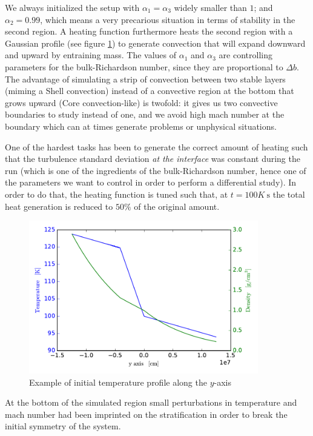 We always initialized the setup with $\alpha_{1} = \alpha_{3}$ widely smaller than $1$; and $\alpha_{2}=0.99$, which means a very precarious situation in terms of stability in the second region. A heating function furthermore heats the second region with a Gaussian profile (see figure \ref{fig:twin}) to generate convection that will expand downward and upward by entraining mass. The values of $\alpha_{1}$ and $\alpha_{3}$ are controlling parameters for the bulk-Richardson number, since they are proportional to $\Delta b$. The advantage of simulating a strip of convection between two stable layers (miming a Shell convection) instead of a convective region at the bottom that grows upward (Core convection-like) is twofold: it gives us two convective boundaries to study instead of one, and we avoid high mach number at the boundary which can at times generate problems or unphysical situations. 

One of the hardest tasks has been to generate the correct amount of heating such that the turbulence standard deviation \textit{at the interface} was constant during the run (which is one of the ingredients of the bulk-Richardson number, hence one of the parameters we want to control in order to perform a differential study). In order to do that, the heating function is tuned such that, at $t=100K \ \mathrm{s}$ the total heat generation is reduced to $50 \%$ of the original amount.

\begin{figure}[t]
\centering
\includegraphics[width=10cm]{./img/twin.pdf}
\caption{Example of initial temperature profile along the $y$-axis}
\label{fig:twin}
\centering
\end{figure}
At the bottom of the simulated region small perturbations in temperature and mach number had been imprinted on the stratification in order to break the initial symmetry of the system.

